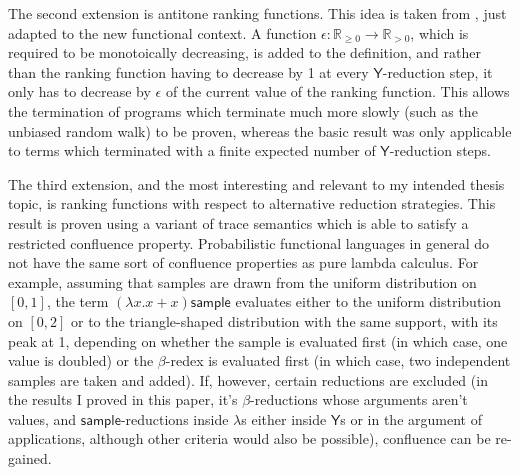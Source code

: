 \documentclass[titlepage]{article}
\newcommand{\tY}{\mathsf{Y}}
\newcommand{\tsample}{\mathsf{sample}}
\begin{document}
The second extension is antitone ranking functions. This idea is taken from \cite{some citation needed}, just adapted to the new functional context. A function $\epsilon : \mathbb R_{\geq 0} \to \mathbb R_{> 0}$, which is required to be monotoically decreasing, is added to the definition, and rather than the ranking function having to decrease by 1 at every $\tY$-reduction step, it only has to decrease by $\epsilon$ of the current value of the ranking function. This allows the termination of programs which terminate much more slowly (such as the unbiased random walk) to be proven, whereas the basic result was only applicable to terms which terminated with a finite expected number of $\tY$-reduction steps.

The third extension, and the most interesting and relevant to my intended thesis topic, is ranking functions with respect to alternative reduction strategies. This result is proven using a variant of trace semantics which is able to satisfy a restricted confluence property. Probabilistic functional languages in general do not have the same sort of confluence properties as pure lambda calculus. For example, assuming that samples are drawn from the uniform distribution on $[0,1]$, the term $(\lambda x. x + x) \tsample$ evaluates either to the uniform distribution on $[0,2]$ or to the triangle-shaped distribution with the same support, with its peak at 1, depending on whether the sample is evaluated first (in which case, one value is doubled) or the $\beta$-redex is evaluated first (in which case, two independent samples are taken and added). If, however, certain reductions are excluded (in the results I proved in this paper, it's $\beta$-reductions whose arguments aren't values, and $\tsample$-reductions inside $\lambda$s either inside $\tY$s or in the argument of applications, although other criteria would also be possible), confluence can be re-gained.
\end{document}
